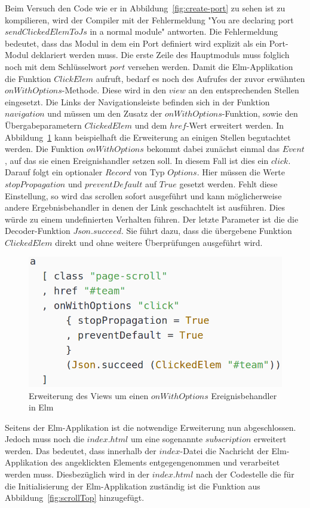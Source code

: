 Beim Versuch den Code wie er in Abbildung~\ref{fig:create-port} zu sehen ist zu kompilieren, wird der Compiler mit der Fehlermeldung "You are declaring port $sendClickedElemToJs$ in a normal module" antworten. Die Fehlermeldung bedeutet, dass das Modul in dem ein Port definiert wird explizit als ein Port-Modul deklariert werden muss. Die erste Zeile des Hauptmoduls muss folglich noch mit dem Schlüsselwort $port$ versehen werden. Damit die Elm-Applikation die Funktion $ClickElem$ aufruft, bedarf es noch des Aufrufes der zuvor erwähnten $onWithOptions$-Methode. Diese wird in den $view$ an den entsprechenden Stellen eingesetzt. Die Links der Navigationsleiste befinden sich in der Funktion $navigation$ und müssen um den Zusatz der $onWithOptions$-Funktion, sowie den Übergabeparametern $ClickedElem$ und dem $href$-Wert erweitert werden. In Abbildung~\ref{fig:elm-view-onclick} kann beispielhaft die Erweiterung an einigen Stellen begutachtet werden. Die Funktion $onWithOptions$ bekommt dabei zunächst einmal das $Event$, auf das sie einen Ereignishandler setzen soll. In diesem Fall ist dies ein $click$. Darauf folgt ein optionaler $Record$ von Typ $Options$. Hier müssen die Werte $stopPropagation$ und $preventDefault$ auf $True$ gesetzt werden. Fehlt diese Einstellung, so wird das scrollen sofort ausgeführt und kann möglicherweise andere Ergebnisbehandler in denen der Link geschachtelt ist ausführen. Dies würde zu einem undefinierten Verhalten führen. Der letzte Parameter ist die die Decoder-Funktion $Json.succeed$. Sie führt dazu, dass die übergebene Funktion $ClickedElem$ direkt und ohne weitere Überprüfungen ausgeführt wird.
\begin{figure}[hbt]
\centering
\includegraphics[scale=0.4]{img/elm-view-onclick.png}
\caption{Erweiterung des Views um einen $onWithOptions$ Ereignisbehandler in Elm}\label{fig:elm-view-onclick}
\end{figure}
Seitens der Elm-Applikation ist die notwendige Erweiterung nun abgeschlossen. Jedoch muss noch die $index.html$ um eine sogenannte $subscription$ erweitert werden. Das bedeutet, dass innerhalb der $index$-Datei die Nachricht der Elm-Applikation des angeklickten Elements entgegengenommen und verarbeitet werden muss. Diesbezüglich wird in der $index.html$ nach der Codestelle die für die Initialisierung der Elm-Applikation zuständig ist die Funktion aus Abbildung~\ref{fig:scrollTop} hinzugefügt.
